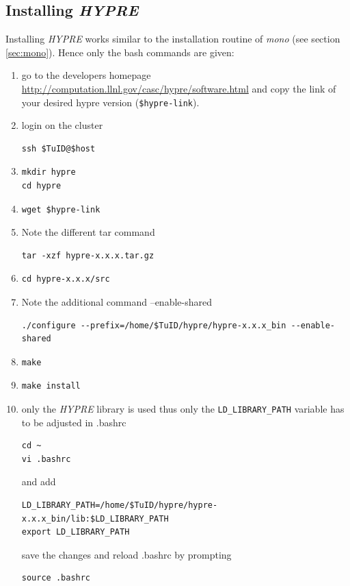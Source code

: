 \documentclass[11pt,twoside,a4paper]{fdyartcl}
\begin{document}
\subsection{Installing \emph{HYPRE}}
Installing \emph{HYPRE} works similar to the installation routine of \emph{mono} (see section \ref{sec:mono}). Hence only the bash commands are given:
\begin{enumerate}
\item go to the developers homepage \url{http://computation.llnl.gov/casc/hypre/software.html} and copy the link of your desired hypre version (\verb|$hypre-link|). 
\item login on the cluster
\begin{verbatim}
ssh $TuID@$host
\end{verbatim}
\item 
\begin{verbatim}
mkdir hypre
cd hypre
\end{verbatim}
\item 
\begin{verbatim}
wget $hypre-link
\end{verbatim}
\item Note the different tar command
\begin{verbatim}
tar -xzf hypre-x.x.x.tar.gz
\end{verbatim}
\item 
\begin{verbatim}
cd hypre-x.x.x/src
\end{verbatim}
\item Note the additional command --enable-shared 
\begin{verbatim}
./configure --prefix=/home/$TuID/hypre/hypre-x.x.x_bin --enable-shared
\end{verbatim} 
\item 
\begin{verbatim}
make
\end{verbatim}
\item
\begin{verbatim}
make install
\end{verbatim} 
\item only the \emph{HYPRE} library is used thus only the \verb|LD_LIBRARY_PATH| variable has to be adjusted in .bashrc
\begin{verbatim}
cd ~
vi .bashrc
\end{verbatim}
and add
\begin{verbatim}
LD_LIBRARY_PATH=/home/$TuID/hypre/hypre-x.x.x_bin/lib:$LD_LIBRARY_PATH
export LD_LIBRARY_PATH
\end{verbatim}
save the changes and reload .bashrc by prompting
\begin{verbatim}
source .bashrc
\end{verbatim}
\end{enumerate} 
\end{document}
